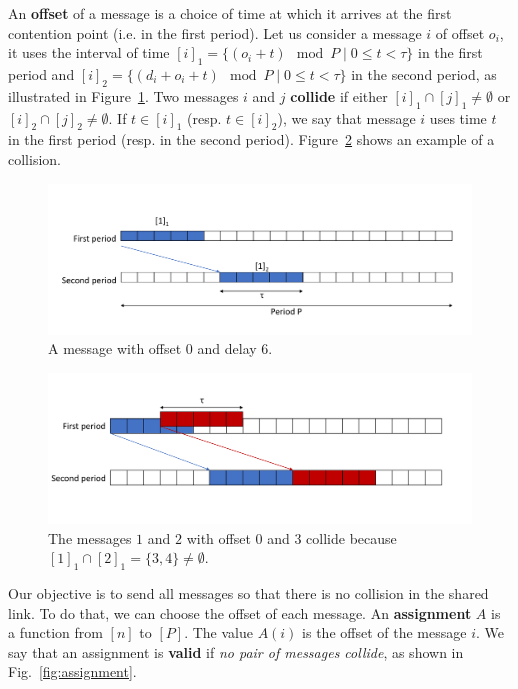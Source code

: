\documentclass[pdflatex,sn-mathphys,iicol]{sn-jnl}%
\theoremstyle{thmstyleone}%
\theoremstyle{thmstyletwo}%
\theoremstyle{thmstylethree}%
\begin{document}
An \textbf{offset} of a message is a choice of time at which it arrives at the first contention point (i.e. in the first period). Let us consider a message $i$ of offset $o_i$, it uses the interval of time $[i]_1 = \{ (o_i + t) \mod P \mid 0 \leq t < \tau \}$ in the first period and $[i]_2 = \{ (d_i + o_i + t) \mod P \mid 0 \leq t < \tau \}$ in the second period, as illustrated in Figure~\ref{fig:offset}. Two messages $i$ and $j$ \textbf{collide} if either $[i]_1 \cap [j]_1 \neq \emptyset $ or $[i]_2 \cap [j]_2 \neq \emptyset $. If $t \in [i]_1$ (resp. $t \in [i]_2$), we say that message $i$ uses time $t$ in the first period (resp. in the second period). Figure~\ref{fig:collide} shows an example of a collision.
 \begin{center}
\begin{figure}

\centering
\includegraphics[scale=0.28]{offset.pdf} 

\caption{A message with offset $0$ and delay $6$.}
\label{fig:offset}
\end{figure}
\end{center}
 \begin{center}
\begin{figure}

\centering
\includegraphics[scale=0.28]{collide.pdf} 

\caption{The messages $1$ and $2$ with offset $0$ and $3$ collide because $[1]_1 \cap [2]_1 = \{3,4\} \neq \emptyset$.}
\label{fig:collide}
\end{figure}
\end{center}
Our objective is to send all messages so that there is no collision in the shared link.
To do that, we can choose the offset of each message. An \textbf{assignment} $A$ is a function from $[n]$ to $[P]$. The value $A(i)$ is the offset of the message $i$. We say that an assignment is \textbf{valid} if \emph{no pair of messages collide}, as shown in Fig.~\ref{fig:assignment}.
\end{document}
